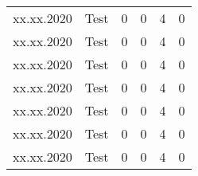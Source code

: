 \begin{landscape}
\begin{longtable}[c]{lp{10cm}rrrr}
	xx.xx.2020 
	& Test
	& 0 %
	& 0 %
	& 4 %
	& 0\\ %

	xx.xx.2020 
	& Test
	& 0 %
	& 0 %
	& 4 %
	& 0\\ %

	xx.xx.2020 
	& Test
	& 0 %
	& 0 %
	& 4 %
	& 0\\ %
	
	xx.xx.2020 
	& Test
	& 0 %
	& 0 %
	& 4 %
	& 0\\ %

	xx.xx.2020 
	& Test
	& 0 %
	& 0 %
	& 4 %
	& 0\\ %

	xx.xx.2020 
	& Test
	& 0 %
	& 0 %
	& 4 %
	& 0\\ %

	xx.xx.2020 
	& Test
	& 0 %
	& 0 %
	& 4 %
	& 0\\ %
	
\end{longtable}


\end{landscape}
